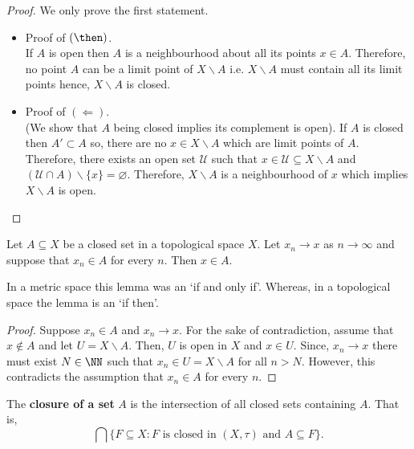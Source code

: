 \documentclass[12pt, a4paper]{article}
\begin{document}
\begin{proof}
    We only prove the first statement.
    \begin{itemize}
        \item Proof of \((\then)\). \\
        If \(A\) is open then \(A\) is a neighbourhood about all its points \(x \in A\). Therefore, no point \(A\) can be a limit point of \(X \backslash A\) i.e. \(X \backslash A\) must contain all its limit points hence, \(X \backslash A\) is closed.
        \item Proof of \((\Leftarrow)\). \\
        (We show that \(A\) being closed implies its complement is open). If \(A\) is closed then \(A'\subset A\) so, there are no \(x \in X \backslash A\) which are limit points of \(A\). Therefore, there exists an open set \(\mathcal{U}\) such that \(x \in \mathcal{U} \subseteq X \backslash A\) and \((\mathcal{U} \cap A) \backslash \{x\} = \varnothing\). Therefore, \(X \backslash A\) is a neighbourhood of \(x\) which implies \(X \backslash A\) is open.
    \end{itemize}
\end{proof}

\begin{lemma}
    Let \(A \subseteq X\) be a closed set in a topological space \(X\). Let \(x_n \to x\) as \(n \to \infty\) and suppose that \(x_n \in A\) for every \(n\). Then \(x \in A\).
\end{lemma}

\begin{mdremark}
    In a metric space this lemma was an `if and only if'. Whereas, in a topological space the lemma is an `if then'.
\end{mdremark}

\begin{proof}
    Suppose \(x_n \in A\) and \(x_n \to x\). For the sake of contradiction, assume that \(x \not\in A\) and let \(U = X \backslash A\). Then, \(U\) is open in \(X\) and \(x \in U\). Since, \(x_n \to x\) there must exist \(N \in \NN\) such that \(x_n \in U = X \backslash A\) for all \(n>N\). However, this contradicts the assumption that \(x_n \in A\) for every \(n\).
\end{proof}

\begin{definition}
    The \textbf{closure of a set} \(A\) is the intersection of all closed sets containing \(A\). That is,
    \[\bigcap \{F \subseteq X : F \text{ is closed in } (X,\tau) \text{ and } A \subseteq F\}.\]
\end{definition}
\end{document}
